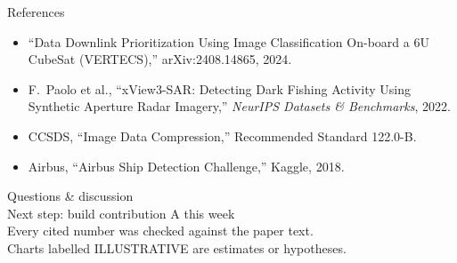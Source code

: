 \documentclass[aspectratio=169,10pt]{beamer}
\begin{document}
\begin{frame}[allowframebreaks]{References}
\begin{itemize}
  \item ``Data Downlink Prioritization Using Image Classification On-board a 6U CubeSat (VERTECS),'' arXiv:2408.14865, 2024.
  \item F.~Paolo et al., ``xView3-SAR: Detecting Dark Fishing Activity Using Synthetic Aperture Radar Imagery,'' \emph{NeurIPS Datasets \& Benchmarks}, 2022.
  \item CCSDS, ``Image Data Compression,'' Recommended Standard 122.0-B.
  \item Airbus, ``Airbus Ship Detection Challenge,'' Kaggle, 2018.
\end{itemize}
\end{frame}

\begin{frame}
\centering
\vspace{1cm}
{\Huge\color{space} Questions \& discussion}\\[8mm]
{\large Next step: build contribution A this week}\\[4mm]
{\small\color{muted} Every cited number was checked against the paper text.\\
Charts labelled ILLUSTRATIVE are estimates or hypotheses.}
\end{frame}
\end{document}
